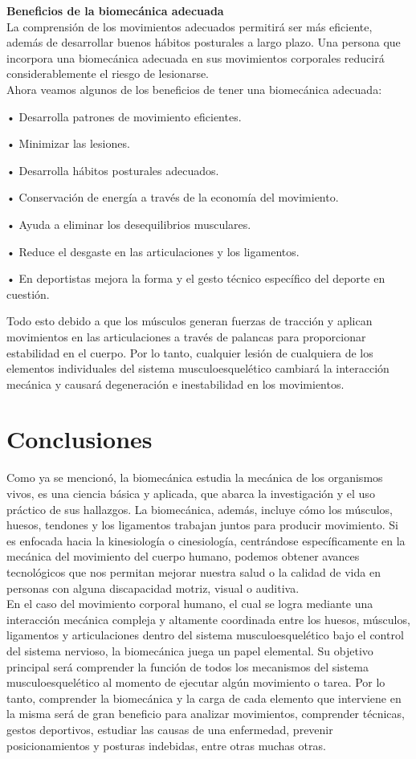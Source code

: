 \documentclass{article}
\begin{document}
\textbf{Beneficios de la biomecánica adecuada} \\
La comprensión de los movimientos adecuados permitirá ser más eficiente, además de desarrollar buenos hábitos posturales a largo plazo. Una persona que incorpora una biomecánica adecuada en sus movimientos corporales reducirá considerablemente el riesgo de lesionarse. \cite{ff5} \\
Ahora veamos algunos de los beneficios de tener una biomecánica adecuada:
\begin{description}
\item •	Desarrolla patrones de movimiento eficientes.
\item •	Minimizar las lesiones.
\item •	Desarrolla hábitos posturales adecuados.
\item •	Conservación de energía a través de la economía del movimiento.
\item •	Ayuda a eliminar los desequilibrios musculares.
\item •	Reduce el desgaste en las articulaciones y los ligamentos.
\item •	En deportistas mejora la forma y el gesto técnico específico del deporte en cuestión.
\end{description}
Todo esto debido a que los músculos generan fuerzas de tracción y aplican movimientos en las articulaciones a través de palancas para proporcionar estabilidad en el cuerpo. Por lo tanto, cualquier lesión de cualquiera de los elementos individuales del sistema musculoesquelético cambiará la interacción mecánica y causará degeneración e inestabilidad en los movimientos.

\section{Conclusiones}

Como ya se mencionó, la biomecánica estudia la mecánica de los organismos vivos, es una ciencia básica y aplicada, que abarca la investigación y el uso práctico de sus hallazgos. La biomecánica, además, incluye cómo los músculos, huesos, tendones y los ligamentos trabajan juntos para producir movimiento. Si es enfocada hacia la kinesiología o cinesiología, centrándose específicamente en la mecánica del movimiento del cuerpo humano, podemos obtener avances tecnológicos que nos permitan mejorar nuestra salud o la calidad de vida en personas con alguna discapacidad motriz, visual o auditiva. \\
En el caso del movimiento corporal humano, el cual se logra mediante una interacción mecánica compleja y altamente coordinada entre los huesos, músculos, ligamentos y articulaciones dentro del sistema musculoesquelético bajo el control del sistema nervioso, la biomecánica juega un papel elemental. Su objetivo principal será comprender la función de todos los mecanismos del sistema musculoesquelético al momento de ejecutar algún movimiento o tarea. Por lo tanto, comprender la biomecánica y la carga de cada elemento que interviene en la misma será de gran beneficio para analizar movimientos, comprender técnicas, gestos deportivos, estudiar las causas de una enfermedad, prevenir posicionamientos y posturas indebidas, entre otras muchas otras. 




\end{document}
